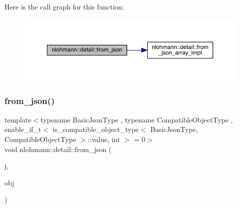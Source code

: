 Here is the call graph for this function\+:
\nopagebreak
\begin{figure}[H]
\begin{center}
\leavevmode
\includegraphics[width=350pt]{namespacenlohmann_1_1detail_a8dcac00852dbe1f61d1e78135b19d428_cgraph}
\end{center}
\end{figure}
\mbox{\label{namespacenlohmann_1_1detail_a5e7a3674e8ac46f8feebad9712d7c55f}} 
\subsubsection{\texorpdfstring{from\_json()}{from\_json()}\hspace{0.1cm}{\footnotesize\ttfamily [10/11]}}
{\footnotesize\ttfamily template$<$typename Basic\+Json\+Type , typename Compatible\+Object\+Type , enable\+\_\+if\+\_\+t$<$ is\+\_\+compatible\+\_\+object\+\_\+type$<$ Basic\+Json\+Type, Compatible\+Object\+Type $>$\+::value, int $>$  = 0$>$ \\
void nlohmann\+::detail\+::from\+\_\+json (\begin{DoxyParamCaption}\item[{const Basic\+Json\+Type \&}]{j,  }\item[{Compatible\+Object\+Type \&}]{obj }\end{DoxyParamCaption})}

\mbox{\label{namespacenlohmann_1_1detail_a839b0ab50d2c9bce669068f56bc41202}} 
